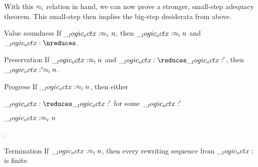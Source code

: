 With this $ \approx\sb{\text{\normalfont\scshape i}} $ relation in hand, we can now prove a stronger, small-step adequacy theorem.
This small-step  then implies the big-step desiderata from above.
%
\begin{theorem}\label{thm:string-rewriting:inc-small-step-adequacy}
  \leavevmode
  \begin{thinthmdescription}
  \item[Value soundness]
    If $\__logic_octx: \approx\sb{\text{\normalfont\scshape v}} n$, then $\__logic_octx: \approx\sb{\text{\normalfont\scshape i}} n$ and $\octx \nreduces$.
  \item[Preservation]
    If $\__logic_octx: \approx\sb{\text{\normalfont\scshape i}} n$ and $\octx \reduces \octx'$, then $\__logic_octx:' \approx\sb{\text{\normalfont\scshape i}} n$.
  \item[Progress]
    If $\__logic_octx: \approx\sb{\text{\normalfont\scshape i}} n$, then either
    \begin{itemize*}[
      label=, afterlabel=,
      before=\unskip:\space,
      itemjoin=;\space, itemjoin*=; or\space%
    ]
    \item $\octx \reduces \octx'$ for some $\__logic_octx:'$
    \item $\__logic_octx: \approx\sb{\text{\normalfont\scshape v}} n$%
    \end{itemize*}.
  \item[Termination]
    If $\__logic_octx: \approx\sb{\text{\normalfont\scshape i}} n$, then every rewriting sequence from $\__logic_octx:$ is finite.
  \end{thinthmdescription}
\end{theorem}
%
